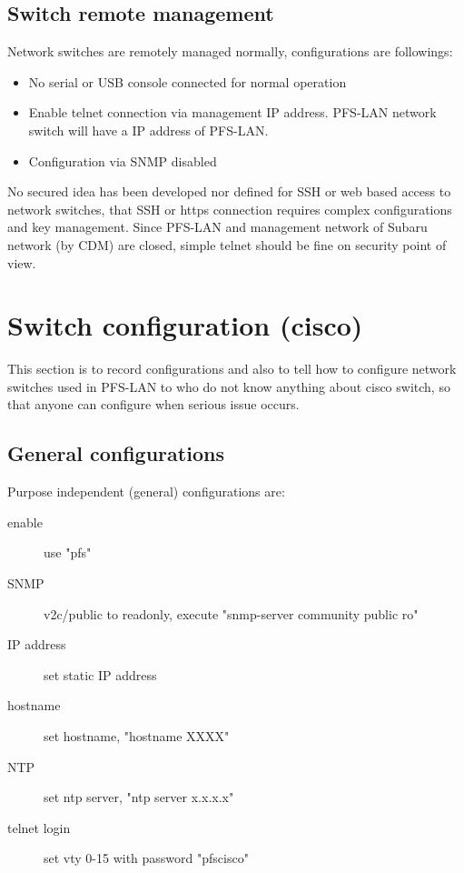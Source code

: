 \documentclass[a4paper,notitlepage]{article}
\begin{document}
\subsection{Switch remote management}

Network switches are remotely managed normally, configurations are followings: 

\begin{itemize}
  \item No serial or USB console connected for normal operation
  \item Enable telnet connection via management IP address. PFS-LAN network 
    switch will have a IP address of PFS-LAN.
  \item Configuration via SNMP disabled
\end{itemize}

No secured idea has been developed nor defined for SSH or web based access to 
network switches, that SSH or https connection requires complex configurations 
and key management. Since PFS-LAN and management network of Subaru network (by 
CDM) are closed, simple telnet should be fine on security point of view.

\section{Switch configuration (cisco)}

This section is to record configurations and also to tell how to configure 
network switches used in PFS-LAN to who do not know anything about cisco 
switch, so that anyone can configure when serious issue occurs. 

\subsection{General configurations}

Purpose independent (general) configurations are:

\begin{description}
  \item[enable] use "pfs"
  \item[SNMP] v2c/public to readonly, execute "snmp-server community public ro"
  \item[IP address] set static IP address
  \item[hostname] set hostname, "hostname XXXX"
  \item[NTP] set ntp server, "ntp server x.x.x.x"
  \item[telnet login] set vty 0-15 with password "pfscisco"
\end{description}
\end{document}
